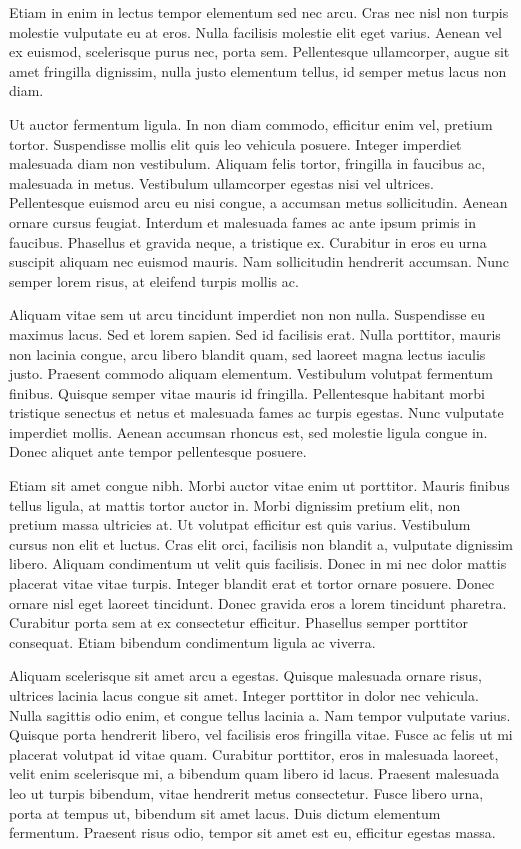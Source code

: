 \documentclass[10pt, a4paper]{article}
\theoremstyle{theorem-style}
\theoremstyle{definition-style}
\theoremstyle{remark-style}
\theoremstyle{example-style}
\theoremstyle{definition-style}
\theoremstyle{remark-style}
\begin{document}
Etiam in enim in lectus tempor elementum sed nec arcu. Cras nec nisl non turpis molestie vulputate eu at eros. Nulla facilisis molestie elit eget varius. Aenean vel ex euismod, scelerisque purus nec, porta sem. Pellentesque ullamcorper, augue sit amet fringilla dignissim, nulla justo elementum tellus, id semper metus lacus non diam.

Ut auctor fermentum ligula. In non diam commodo, efficitur enim vel, pretium tortor. Suspendisse mollis elit quis leo vehicula posuere. Integer imperdiet malesuada diam non vestibulum. Aliquam felis tortor, fringilla in faucibus ac, malesuada in metus. Vestibulum ullamcorper egestas nisi vel ultrices. Pellentesque euismod arcu eu nisi congue, a accumsan metus sollicitudin. Aenean ornare cursus feugiat. Interdum et malesuada fames ac ante ipsum primis in faucibus. Phasellus et gravida neque, a tristique ex. Curabitur in eros eu urna suscipit aliquam nec euismod mauris. Nam sollicitudin hendrerit accumsan. Nunc semper lorem risus, at eleifend turpis mollis ac.

Aliquam vitae sem ut arcu tincidunt imperdiet non non nulla. Suspendisse eu maximus lacus. Sed et lorem sapien. Sed id facilisis erat. Nulla porttitor, mauris non lacinia congue, arcu libero blandit quam, sed laoreet magna lectus iaculis justo. Praesent commodo aliquam elementum. Vestibulum volutpat fermentum finibus. Quisque semper vitae mauris id fringilla. Pellentesque habitant morbi tristique senectus et netus et malesuada fames ac turpis egestas. Nunc vulputate imperdiet mollis. Aenean accumsan rhoncus est, sed molestie ligula congue in. Donec aliquet ante tempor pellentesque posuere.

Etiam sit amet congue nibh. Morbi auctor vitae enim ut porttitor. Mauris finibus tellus ligula, at mattis tortor auctor in. Morbi dignissim pretium elit, non pretium massa ultricies at. Ut volutpat efficitur est quis varius. Vestibulum cursus non elit et luctus. Cras elit orci, facilisis non blandit a, vulputate dignissim libero. Aliquam condimentum ut velit quis facilisis. Donec in mi nec dolor mattis placerat vitae vitae turpis. Integer blandit erat et tortor ornare posuere. Donec ornare nisl eget laoreet tincidunt. Donec gravida eros a lorem tincidunt pharetra. Curabitur porta sem at ex consectetur efficitur. Phasellus semper porttitor consequat. Etiam bibendum condimentum ligula ac viverra.

Aliquam scelerisque sit amet arcu a egestas. Quisque malesuada ornare risus, ultrices lacinia lacus congue sit amet. Integer porttitor in dolor nec vehicula. Nulla sagittis odio enim, et congue tellus lacinia a. Nam tempor vulputate varius. Quisque porta hendrerit libero, vel facilisis eros fringilla vitae. Fusce ac felis ut mi placerat volutpat id vitae quam. Curabitur porttitor, eros in malesuada laoreet, velit enim scelerisque mi, a bibendum quam libero id lacus. Praesent malesuada leo ut turpis bibendum, vitae hendrerit metus consectetur. Fusce libero urna, porta at tempus ut, bibendum sit amet lacus. Duis dictum elementum fermentum. Praesent risus odio, tempor sit amet est eu, efficitur egestas massa.
\end{document}
